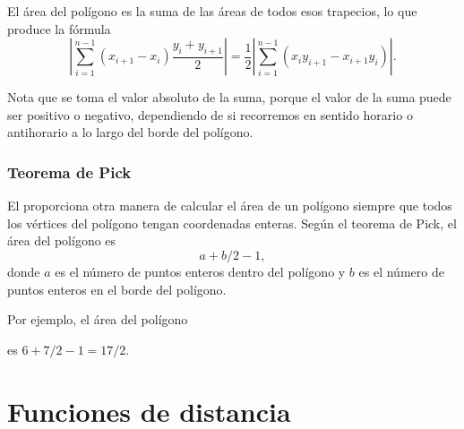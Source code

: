 El área del polígono es la suma de las áreas de
todos esos trapecios, lo que produce la fórmula
\[|\sum_{i=1}^{n-1} (x_{i+1}-x_{i}) \frac{y_i+y_{i+1}}{2}| =
\frac{1}{2} |\sum_{i=1}^{n-1} (x_i y_{i+1} - x_{i+1} y_i)|.\]

Nota que se toma el valor absoluto de la suma,
porque el valor de la suma puede ser positivo o negativo,
dependiendo de si recorremos en sentido horario o antihorario
a lo largo del borde del polígono.

\subsubsection{Teorema de Pick}


El  proporciona otra manera de calcular
el área de un polígono siempre que todos los vértices
del polígono tengan coordenadas enteras.
Según el teorema de Pick, el área del polígono es
\[ a + b/2 -1,\]
donde $a$ es el número de puntos enteros dentro del polígono
y $b$ es el número de puntos enteros en el borde del polígono.

Por ejemplo, el área del polígono
\begin{center}
\end{center}
es $6+7/2-1=17/2$.

\section{Funciones de distancia}

